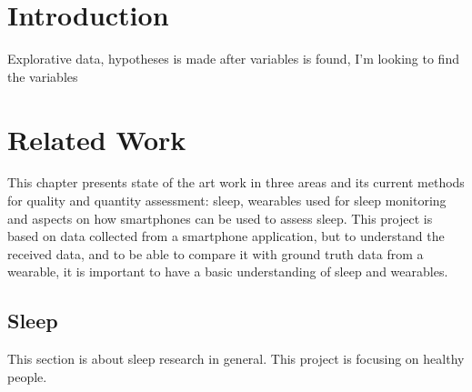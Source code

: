 \documentclass[12pt]{article} %
\begin{document}


\begin{abstract} 
  
\end{abstract}


\newpage
\tableofcontents

\newpage
\renewcommand{\abstractname}{Acknowledgements}
\begin{abstract}
\end{abstract}

\newpage  
\listoffigures
{} %

\listoftables
{} %

\newpage
\section{Introduction}
Explorative data, hypotheses is made after variables is found, I'm looking to find the variables 

\newpage
\section{Related Work}
This chapter presents state of the art work in three areas and its current methods for quality and quantity assessment: sleep, wearables used for sleep monitoring and aspects on how smartphones can be used to assess sleep. This project is based on data collected from a smartphone application, but to understand the received data, and to be able to compare it with ground truth data from a wearable, it is important to have a basic understanding of sleep and wearables.

\subsection{Sleep}
This section is about sleep research in general. This project is focusing on healthy people. \\
\end{document}
